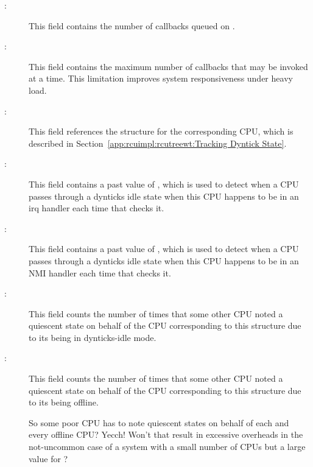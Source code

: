 \begin{description}
\item[:]
	This field contains the number of callbacks queued on
	.
\item[:]
	This field contains the maximum number of callbacks that may
	be invoked at a time.
	This limitation improves system responsiveness under heavy load.
\item[:]
	This field references the  structure for
	the corresponding CPU, which is described in
	Section~\ref{app:rcuimpl:rcutreewt:Tracking Dyntick State}.
\item[:]
	This field contains a past value of ,
	which is used to detect when a CPU passes through a dynticks
	idle state when this CPU happens to be in an irq
	handler each time that  checks it.
\item[:]
	This field contains a past value of ,
	which is used to detect when a CPU passes through a dynticks
	idle state when this CPU happens to be in an NMI
	handler each time that  checks it.
\item[:]
	This field counts the number of times that some other CPU noted
	a quiescent state on behalf of
	the CPU corresponding to this  structure due to
	its being in dynticks-idle mode.
\item[:]
	This field counts the number of times that some other CPU noted
	a quiescent state on behalf of
	the CPU corresponding to this  structure due to
	its being offline.

\QuickQuiz{}
	So some poor CPU has to note quiescent states on behalf of
	each and every offline CPU?
	Yecch!
	Won't that result in excessive overheads in the not-uncommon
	case of a system with a small number of CPUs but a large value
	for ?
 \QuickQuizEnd


\end{description}
